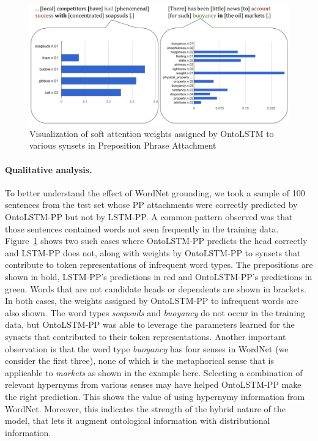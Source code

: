 \begin{figure}
\begin{center}
\includegraphics[width=6.2in]{figures/ontolstm_relative_attention.png}
\caption{Visualization of soft attention weights assigned by OntoLSTM to various synsets in Preposition Phrase Attachment}\label{fig:ontolstm_pp_attention_visualization}
\end{center}
\end{figure}
\paragraph{Qualitative analysis.} To better understand the effect of WordNet grounding, we took a sample of 100 sentences from the test set whose PP attachments were correctly predicted by OntoLSTM-PP but not by LSTM-PP\@. 
A common pattern observed was that those sentences contained words not seen frequently in the training data. Figure~\ref{fig:ontolstm_pp_attention_visualization} shows two such cases where OntoLSTM-PP predicts the head correctly and
LSTM-PP does not, along with weights by OntoLSTM-PP to synsets that contribute to token representations of infrequent word types.
The prepositions are shown in bold, LSTM-PP's predictions in red and OntoLSTM-PP's predictions in green. Words that are not candidate heads or dependents are shown in brackets.
In both cases, the weights assigned by OntoLSTM-PP to infrequent words are also shown. The word types \textit{soapsuds} and \textit{buoyancy} 
do not occur in the training data, but OntoLSTM-PP was able to leverage the parameters learned for the synsets that contributed to their token representations.
Another important observation is that the word type \textit{buoyancy} has four senses in WordNet (we consider the first three), none of which is the metaphorical sense that is applicable to \textit{markets} as shown in the example here. Selecting a combination of relevant hypernyms from various senses may have helped OntoLSTM-PP make the right prediction. This shows the value of using hypernymy information from WordNet. Moreover, this indicates the strength of the hybrid nature of the model, that lets it augment ontological information with distributional information.

